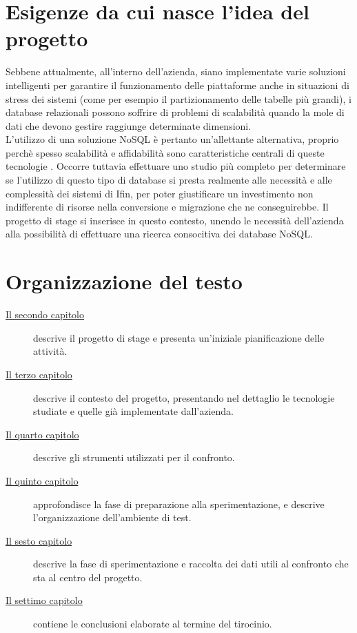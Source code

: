 \section{Esigenze da cui nasce l'idea del progetto}

Sebbene attualmente, all'interno dell'azienda, siano implementate varie soluzioni intelligenti per garantire il funzionamento delle piattaforme anche in situazioni di stress dei sistemi (come per esempio il partizionamento delle tabelle più grandi), i database relazionali possono soffrire di problemi di scalabilità quando la mole di dati che devono gestire raggiunge determinate dimensioni.\\
L'utilizzo di una soluzione NoSQL è pertanto un'allettante alternativa, proprio perchè spesso scalabilità e affidabilità sono caratteristiche centrali di queste tecnologie \cite{site:mongoarticleadvantages}. Occorre tuttavia effettuare uno studio più completo per determinare se l'utilizzo di questo tipo di database si presta realmente alle necessità e alle complessità dei sistemi di Ifin, per poter giustificare un investimento non indifferente di risorse nella conversione e migrazione che ne conseguirebbe.
Il progetto di stage si inserisce in questo contesto, unendo le necessità dell'azienda alla possibilità di effettuare una ricerca consocitiva dei database NoSQL.\\

\section{Organizzazione del testo}

\begin{description}
    \item[{\hyperref[cap:descrizione-stage]{Il secondo capitolo}}] descrive il progetto di stage e presenta un'iniziale pianificazione delle attività.
    
    \item[{\hyperref[cap:contesto]{Il terzo capitolo}}] descrive il contesto del progetto, presentando nel dettaglio le tecnologie studiate e quelle già implementate dall'azienda.
    
    \item[{\hyperref[cap:strumenti]{Il quarto capitolo}}] descrive gli strumenti utilizzati per il confronto.

    \item[{\hyperref[cap:progettazione]{Il quinto capitolo}}] approfondisce la fase di preparazione alla sperimentazione, e descrive l'organizzazione dell'ambiente di test.
    
    \item[{\hyperref[cap:sperimentazione]{Il sesto capitolo}}] descrive la fase di sperimentazione e raccolta dei dati utili al confronto che sta al centro del progetto.
    
    \item[{\hyperref[cap:conclusioni]{Il settimo capitolo}}] contiene le conclusioni elaborate al termine del tirocinio.
\end{description}